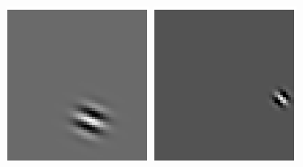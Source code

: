 \begin{figure}[ht]
\begin{center}
\includegraphics[width=\textwidth/9]{ch4/figures/Gabor3.png}
\includegraphics[width=\textwidth/9]{ch4/figures/Gabor4.png}

\end{center}
\end{figure}
